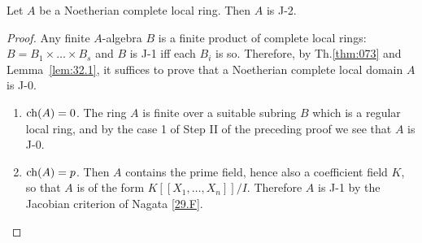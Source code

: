 \documentclass[../main]{subfiles}
\begin{document}
\begin{partheorem}
\label{thm:074}
Let $A$ be a Noetherian complete local ring. Then $A$ is J-2. 
\end{partheorem}

\begin{proof}
Any finite $A$-algebra $B$ is a finite product of complete local rings: \newline $B = B_1 \times \ldots \times B_s$ and $B$ is J-1 iff each $B_i$ is so. Therefore, by Th.\ref{thm:073} and Lemma~\ref{lem:32.1}, it suffices to prove that a Noetherian complete local domain $A$ is J-0.
\begin{enumerate}[label = Case \Roman*. ]
    \item $\operatorname{ch}(A) = 0$. The ring $A$ is finite over a suitable subring $B$ which is a regular local ring, and by the case 1 of Step II of the preceding proof we see that $A$ is J-0.
    \item $\operatorname{ch}(A) = p$. Then $A$ contains the prime field, hence also a coefficient field $K$, so that $A$ is of the form $K[[X_1, \ldots, X_n]]/I$. Therefore $A$ is J-1 by the Jacobian criterion of Nagata \ref{29.F}.
\end{enumerate}
\end{proof}
\end{document}
